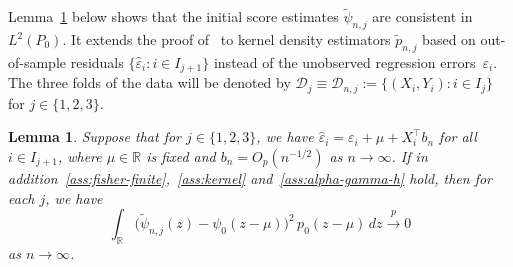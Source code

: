 \documentclass[a4paper]{article}
\newcommand{\R}{\mathbb{R}}
\newcommand{\cvp}{\overset{p}{\to}}
\newtheorem{lemma}[theorem]{Lemma}
\theoremstyle{definition}
\begin{document}
Lemma~\ref{lem:kernel-score-consistency} below shows that the initial score estimates $\tilde{\psi}_{n,j}$ are consistent in $L^2(P_0)$. It extends the proof of~\citet[Lemma~25.64]{vdV1998asymptotic} to kernel density estimators $\tilde{p}_{n,j}$ based on out-of-sample residuals $\{\hat{\varepsilon}_i : i \in I_{j+1}\}$ instead of the unobserved regression errors~$\varepsilon_i$. The three folds of the data will be denoted by $\mathcal{D}_j \equiv \mathcal{D}_{n,j} := \{(X_i, Y_i) : i \in I_j\}$ for $j \in \{1,2,3\}$. 

\begin{lemma}
\label{lem:kernel-score-consistency}
Suppose that for $j \in \{1,2,3\}$, we have $\hat{\varepsilon}_i = \varepsilon_i + \mu + X_i^\top b_n$ for all $i \in I_{j+1}$, where $\mu \in \R$ is fixed and $b_n = O_p(n^{-1/2})$ as $n \to \infty$. If in addition~\emph{\ref{ass:fisher-finite}},~\emph{\ref{ass:kernel}} and~\emph{\ref{ass:alpha-gamma-h}} hold, then for each $j$, we have
\[
\int_\R \bigl(\tilde{\psi}_{n,j}(z) - \psi_0(z - \mu)\bigr)^2\,p_0(z - \mu)\,dz \cvp 0
\]
as $n \to \infty$.
\end{lemma}
\end{document}
